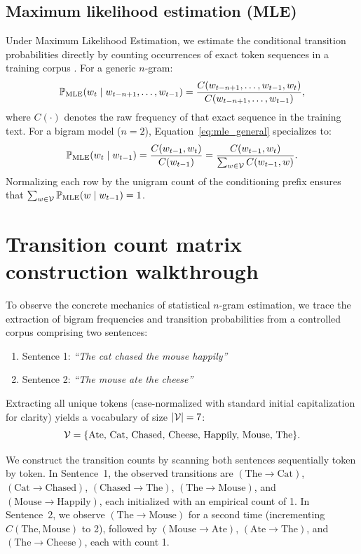 \documentclass[../../main.tex]{subfiles}
\begin{document}
\subsection{Maximum likelihood estimation (MLE)}
Under Maximum Likelihood Estimation, we estimate the conditional transition probabilities directly by counting occurrences of exact token sequences in a training corpus \cite{jurafsky2024}. For a generic $n$-gram:
\begin{equation}
\label{eq:mle_general}
\mathbb{P}_{\text{MLE}}(w_t \mid w_{t-n+1}, \dots, w_{t-1}) = \frac{C(w_{t-n+1}, \dots, w_{t-1}, w_t)}{C(w_{t-n+1}, \dots, w_{t-1})},
\end{equation}
where $C(\cdot)$ denotes the raw frequency of that exact sequence in the training text. For a bigram model ($n=2$), Equation~\eqref{eq:mle_general} specializes to:
\begin{equation}
\label{eq:mle_bigram}
\mathbb{P}_{\text{MLE}}(w_t \mid w_{t-1}) = \frac{C(w_{t-1}, w_t)}{C(w_{t-1})} = \frac{C(w_{t-1}, w_t)}{\sum_{w \in \mathcal{V}} C(w_{t-1}, w)}.
\end{equation}
Normalizing each row by the unigram count of the conditioning prefix ensures that $\sum_{w \in \mathcal{V}} \mathbb{P}_{\text{MLE}}(w \mid w_{t-1}) = 1$.

\clearpage
\section{Transition count matrix construction walkthrough}
\label{sec:count_matrix}

To observe the concrete mechanics of statistical $n$-gram estimation, we trace the extraction of bigram frequencies and transition probabilities from a controlled corpus comprising two sentences:
\begin{enumerate}
    \item Sentence 1: \textit{``The cat chased the mouse happily''}
    \item Sentence 2: \textit{``The mouse ate the cheese''}
\end{enumerate}
Extracting all unique tokens (case-normalized with standard initial capitalization for clarity) yields a vocabulary of size $|\mathcal{V}| = 7$:
\[
\mathcal{V} = \{\text{Ate, Cat, Chased, Cheese, Happily, Mouse, The}\}.
\]

We construct the transition counts by scanning both sentences sequentially token by token. In Sentence~1, the observed transitions are $(\text{The} \to \text{Cat})$, $(\text{Cat} \to \text{Chased})$, $(\text{Chased} \to \text{The})$, $(\text{The} \to \text{Mouse})$, and $(\text{Mouse} \to \text{Happily})$, each initialized with an empirical count of 1. In Sentence~2, we observe $(\text{The} \to \text{Mouse})$ for a second time (incrementing $C(\text{The}, \text{Mouse})$ to 2), followed by $(\text{Mouse} \to \text{Ate})$, $(\text{Ate} \to \text{The})$, and $(\text{The} \to \text{Cheese})$, each with count 1.
\end{document}
